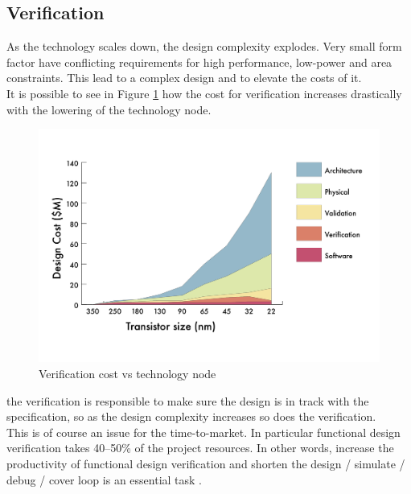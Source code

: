 \subsection{Verification}
As the technology scales down, the design complexity explodes. 
Very small form factor have conflicting requirements for high performance, low-power and area constraints. 
This lead to a complex design and to elevate the costs of it.\\

It is possible to see in Figure \ref{verification-tecnology} how the cost for verification increases drastically with the lowering of the technology node.


\begin{figure}[H]
    \centering
    \includegraphics[scale = 0.4]{Chapter_1/img/cost-scale.png}
    \caption{Verification cost vs technology node \cite{verification-book-2018}}
    \label{verification-tecnology}
\end{figure}

the verification is responsible to make sure the design is in track with the specification, so as the design complexity increases so does the verification.\\

This is of course an issue for the time-to-market. 
In particular functional design verification takes 40–50\% of the project resources. In other words, increase the productivity of functional design verification and shorten the design / simulate / debug / cover loop is an essential task \cite{verification-book-2018}.\\

